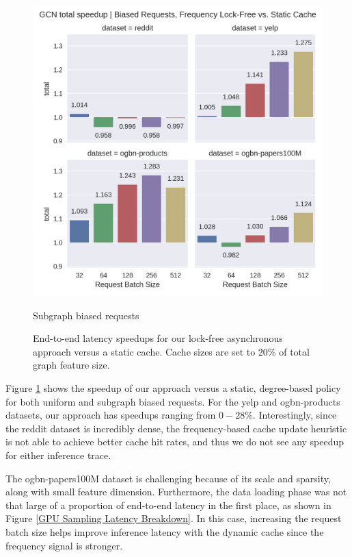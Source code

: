 \begin{figure}[h!]
\begin{minipage}[c]{0.46\textwidth}
        \includegraphics[width=\textwidth]{figures/speedup_GCN_total_bias.png}    
        \caption*{Subgraph biased requests}
    \end{minipage}
    \caption{End-to-end latency speedups for our lock-free asynchronous approach versus a static cache. Cache sizes are set to 20\% of total graph feature size.}
    \label{Eval: Speedups}
\end{figure}    

Figure \ref{Eval: Speedups} shows the speedup of our approach versus a static, degree-based policy for both uniform and subgraph biased requests. For the yelp and ogbn-products datasets, our approach has speedups ranging from $0-28\%$. Interestingly, since the reddit dataset is incredibly dense, the frequency-based cache update heuristic is not able to achieve better cache hit rates, and thus we do not see any speedup for either inference trace.

The ogbn-papers100M dataset is challenging because of its scale and sparsity, along with small feature dimension. Furthermore, the data loading phase was not that large of a proportion of end-to-end latency in the first place, as shown in Figure \ref{GPU Sampling Latency Breakdown}. In this case, increasing the request batch size helps improve inference latency with the dynamic cache since the frequency signal is stronger.

